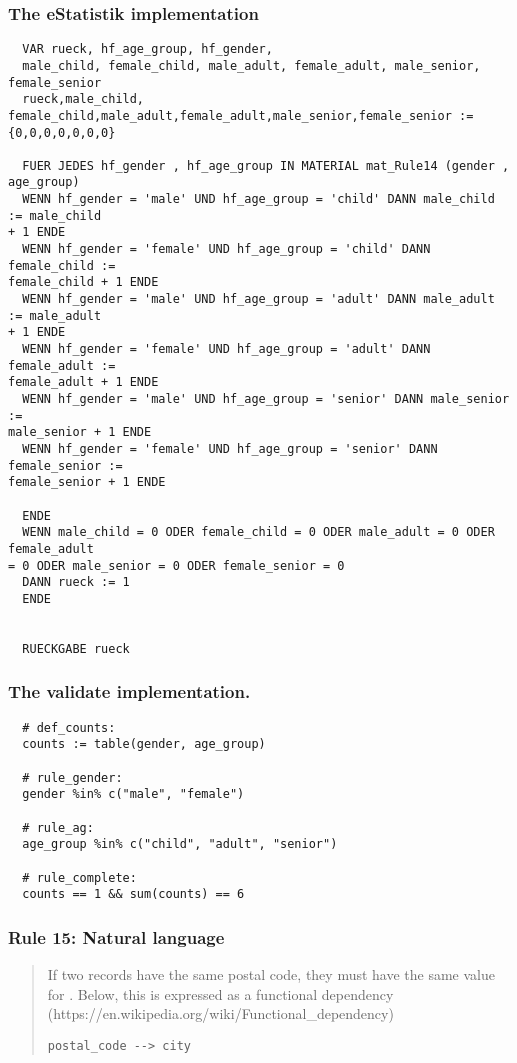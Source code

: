 \subsubsection*{The eStatistik implementation}
\begin{verbatim}
  VAR rueck, hf_age_group, hf_gender,
  male_child, female_child, male_adult, female_adult, male_senior, female_senior
  rueck,male_child,
female_child,male_adult,female_adult,male_senior,female_senior :=
{0,0,0,0,0,0,0}

  FUER JEDES hf_gender , hf_age_group IN MATERIAL mat_Rule14 (gender , age_group)
  WENN hf_gender = 'male' UND hf_age_group = 'child' DANN male_child := male_child
+ 1 ENDE
  WENN hf_gender = 'female' UND hf_age_group = 'child' DANN female_child :=
female_child + 1 ENDE
  WENN hf_gender = 'male' UND hf_age_group = 'adult' DANN male_adult := male_adult
+ 1 ENDE
  WENN hf_gender = 'female' UND hf_age_group = 'adult' DANN female_adult :=
female_adult + 1 ENDE
  WENN hf_gender = 'male' UND hf_age_group = 'senior' DANN male_senior :=
male_senior + 1 ENDE
  WENN hf_gender = 'female' UND hf_age_group = 'senior' DANN female_senior :=
female_senior + 1 ENDE

  ENDE
  WENN male_child = 0 ODER female_child = 0 ODER male_adult = 0 ODER female_adult
= 0 ODER male_senior = 0 ODER female_senior = 0
  DANN rueck := 1
  ENDE


  RUECKGABE rueck
\end{verbatim}
\subsubsection*{The validate implementation.}
\begin{verbatim}
  # def_counts:
  counts := table(gender, age_group)

  # rule_gender:
  gender %in% c("male", "female")

  # rule_ag:
  age_group %in% c("child", "adult", "senior")

  # rule_complete:
  counts == 1 && sum(counts) == 6
\end{verbatim}


\newpage

\subsubsection*{  Rule 15: Natural language}
\begin{quote}


If two records have the same postal code, they must have the same value for . Below, this is expressed
as a functional dependency (https://en.wikipedia.org/wiki/Functional\_dependency)

\begin{verbatim}
postal_code --> city
\end{verbatim}



\end{quote}
